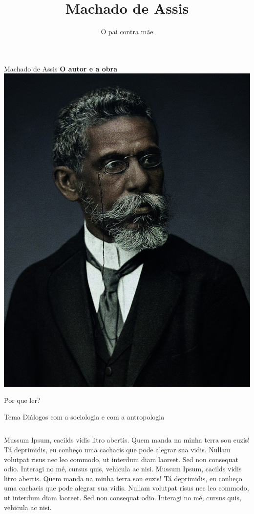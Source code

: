 \documentclass[smaller,professionalfonts]{beamer}
\title{Machado de Assis}
\author{O pai contra mãe}
\institute{Thema: Contos}
\date{}
\begin{document}
\frame{\maketitle}


\begin{frame}[plain]{Machado de Assis}
\centering\LARGE\textbf{O autor e a obra}\\\bigskip
\includegraphics[scale=0.15]{author}
\end{frame}

\begin{frame}[plain]{Por que ler?}
\begin{block}{Tema}
Diálogos com a sociologia e com a antropologia
\end{block}
\bigskip
\begin{columns}
Mussum Ipsum, cacilds vidis litro abertis. Quem manda na minha terra sou euzis! Tá deprimidis, eu conheço uma cachacis que pode alegrar sua vidis. Nullam volutpat risus nec leo commodo, ut interdum diam laoreet. Sed non consequat odio. Interagi no mé, cursus quis, vehicula ac nisi.
Mussum Ipsum, cacilds vidis litro abertis. Quem manda na minha terra sou euzis! Tá deprimidis, eu conheço uma cachacis que pode alegrar sua vidis. Nullam volutpat risus nec leo commodo, ut interdum diam laoreet. Sed non consequat odio. Interagi no mé, cursus quis, vehicula ac nisi.
\end{columns}

\end{frame}
\end{document}
